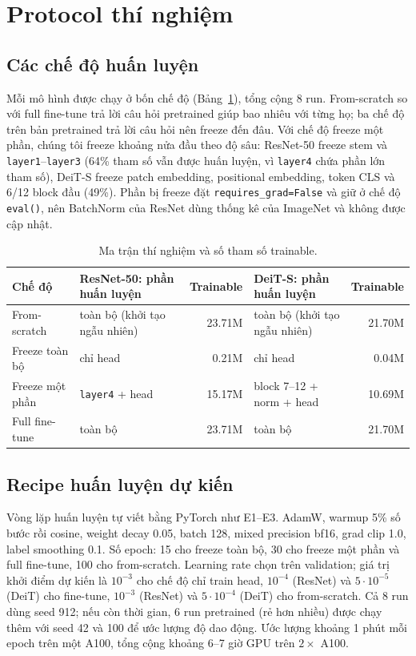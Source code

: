 \documentclass[11pt,a4paper]{article}
\begin{document}
\section{Protocol thí nghiệm}

\subsection{Các chế độ huấn luyện}
Mỗi mô hình được chạy ở bốn chế độ (Bảng~\ref{tab:modes}), tổng cộng 8 run. From-scratch so với full fine-tune trả lời câu hỏi pretrained giúp bao nhiêu với từng họ; ba chế độ trên bản pretrained trả lời câu hỏi nên freeze đến đâu. Với chế độ freeze một phần, chúng tôi freeze khoảng nửa đầu theo độ sâu: ResNet-50 freeze stem và \texttt{layer1}--\texttt{layer3} (64\% tham số vẫn được huấn luyện, vì \texttt{layer4} chứa phần lớn tham số), DeiT-S freeze patch embedding, positional embedding, token CLS và 6/12 block đầu (49\%). Phần bị freeze đặt \texttt{requires\_grad=False} và giữ ở chế độ \texttt{eval()}, nên BatchNorm của ResNet dùng thống kê của ImageNet và không được cập nhật.

\begin{table}[H]
\centering
\caption{Ma trận thí nghiệm và số tham số trainable.}
\label{tab:modes}
\small
\begin{tabular}{llrlr}
\toprule
Chế độ & ResNet-50: phần huấn luyện & Trainable & DeiT-S: phần huấn luyện & Trainable \\
\midrule
From-scratch & toàn bộ (khởi tạo ngẫu nhiên) & 23.71M & toàn bộ (khởi tạo ngẫu nhiên) & 21.70M \\
Freeze toàn bộ & chỉ head & 0.21M & chỉ head & 0.04M \\
Freeze một phần & \texttt{layer4} + head & 15.17M & block 7--12 + norm + head & 10.69M \\
Full fine-tune & toàn bộ & 23.71M & toàn bộ & 21.70M \\
\bottomrule
\end{tabular}
\end{table}

\subsection{Recipe huấn luyện dự kiến}
Vòng lặp huấn luyện tự viết bằng PyTorch như E1--E3. AdamW, warmup 5\% số bước rồi cosine, weight decay 0.05, batch 128, mixed precision bf16, grad clip 1.0, label smoothing 0.1. Số epoch: 15 cho freeze toàn bộ, 30 cho freeze một phần và full fine-tune, 100 cho from-scratch. Learning rate chọn trên validation; giá trị khởi điểm dự kiến là $10^{-3}$ cho chế độ chỉ train head, $10^{-4}$ (ResNet) và $5\cdot10^{-5}$ (DeiT) cho fine-tune, $10^{-3}$ (ResNet) và $5\cdot10^{-4}$ (DeiT) cho from-scratch. Cả 8 run dùng seed 912; nếu còn thời gian, 6 run pretrained (rẻ hơn nhiều) được chạy thêm với seed 42 và 100 để ước lượng độ dao động. Ước lượng khoảng 1 phút mỗi epoch trên một A100, tổng cộng khoảng 6--7 giờ GPU trên $2\times$ A100.
\end{document}

